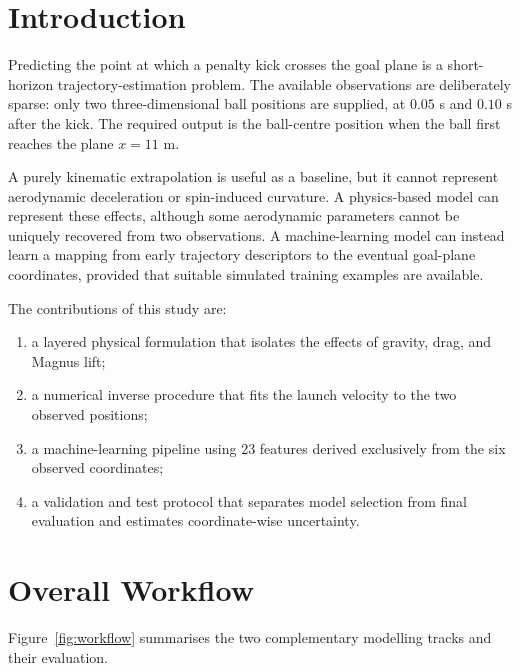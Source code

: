 \documentclass[11pt,a4paper]{article}
\begin{document}
\section{Introduction}
Predicting the point at which a penalty kick crosses the goal plane is a short-horizon trajectory-estimation problem. The available observations are deliberately sparse: only two three-dimensional ball positions are supplied, at $0.05$ s and $0.10$ s after the kick. The required output is the ball-centre position when the ball first reaches the plane $x=11$ m.

A purely kinematic extrapolation is useful as a baseline, but it cannot represent aerodynamic deceleration or spin-induced curvature. A physics-based model can represent these effects, although some aerodynamic parameters cannot be uniquely recovered from two observations. A machine-learning model can instead learn a mapping from early trajectory descriptors to the eventual goal-plane coordinates, provided that suitable simulated training examples are available.

The contributions of this study are:
\begin{enumerate}[leftmargin=*]
    \item a layered physical formulation that isolates the effects of gravity, drag, and Magnus lift;
    \item a numerical inverse procedure that fits the launch velocity to the two observed positions;
    \item a machine-learning pipeline using 23 features derived exclusively from the six observed coordinates;
    \item a validation and test protocol that separates model selection from final evaluation and estimates coordinate-wise uncertainty.
\end{enumerate}

\section{Overall Workflow}
Figure~\ref{fig:workflow} summarises the two complementary modelling tracks and their evaluation.
\end{document}
